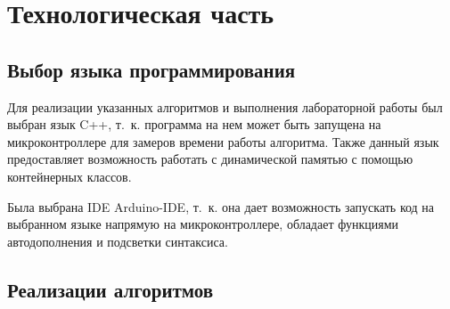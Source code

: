 \chapter{Технологическая часть}

\section{Выбор языка программирования}

Для реализации указанных алгоритмов и выполнения лабораторной работы был выбран язык C++, т.~к. программа на нем может быть запущена на микроконтроллере для замеров времени работы алгоритма. Также данный язык предоставляет возможность работать с динамической памятью с помощью контейнерных классов.

Была выбрана IDE Arduino-IDE, т.~к. она дает возможность запускать код на выбранном языке напрямую на микроконтроллере, обладает функциями автодополнения и подсветки синтаксиса.

\section{Реализации алгоритмов}


